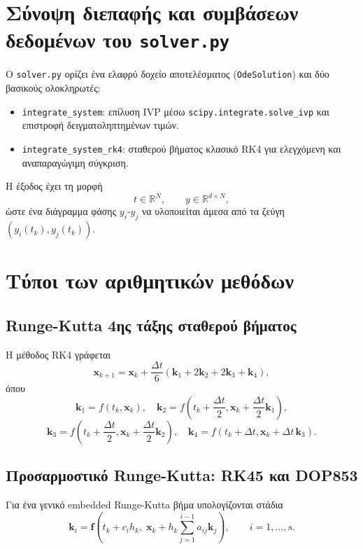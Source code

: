 \documentclass[11pt,a4paper]{report}
\begin{document}
\section{Σύνοψη διεπαφής και συμβάσεων δεδομένων του \texttt{solver.py}}
\label{app:solver-interface}
\begin{importantbox}
Ο \texttt{solver.py} ορίζει ένα ελαφρύ δοχείο αποτελέσματος
(\texttt{OdeSolution}) και δύο βασικούς ολοκληρωτές:
\begin{itemize}
\item \texttt{integrate\_system}: επίλυση IVP μέσω
\texttt{scipy.integrate.solve\_ivp} και επιστροφή δειγματοληπτημένων τιμών.
\item \texttt{integrate\_system\_rk4}: σταθερού βήματος κλασικό RK4 για
ελεγχόμενη και αναπαραγώγιμη σύγκριση.
\end{itemize}
Η έξοδος έχει τη μορφή
\begin{equation*}
t \in \mathbb{R}^{N}, \qquad y \in \mathbb{R}^{d \times N},
\end{equation*}
ώστε ένα διάγραμμα φάσης $y_i$-$y_j$ να υλοποιείται άμεσα από τα ζεύγη
$(y_i(t_k),y_j(t_k))$.
\end{importantbox}

\section{Τύποι των αριθμητικών μεθόδων}

\subsection{Runge-Kutta 4ης τάξης σταθερού βήματος}
\label{app:rk4-formula}
Η μέθοδος RK4 γράφεται
\begin{equation}
\mathbf{x}_{k+1}=\mathbf{x}_k+\frac{\Delta t}{6}\left(\mathbf{k}_1+2\mathbf{k}_2+2\mathbf{k}_3+\mathbf{k}_4\right),
\end{equation}
όπου
\begin{equation}
\mathbf{k}_1=f(t_k,\mathbf{x}_k),\quad
\mathbf{k}_2=f\!\left(t_k+\frac{\Delta t}{2},\mathbf{x}_k+\frac{\Delta t}{2}\mathbf{k}_1\right),
\end{equation}
\begin{equation}
\mathbf{k}_3=f\!\left(t_k+\frac{\Delta t}{2},\mathbf{x}_k+\frac{\Delta t}{2}\mathbf{k}_2\right),\quad
\mathbf{k}_4=f\!\left(t_k+\Delta t,\mathbf{x}_k+\Delta t\,\mathbf{k}_3\right).
\end{equation}

\subsection{Προσαρμοστικό Runge-Kutta: RK45 και DOP853}
\label{app:adaptive-rk-formulas}
Για ένα γενικό embedded Runge-Kutta βήμα υπολογίζονται στάδια
\begin{equation}
\mathbf{k}_i=\mathbf{f}\!\left(t_k+c_i h_k,\;\mathbf{x}_k+h_k\sum_{j=1}^{i-1}a_{ij}\mathbf{k}_j\right),
\qquad i=1,\dots,s.
\end{equation}
\end{document}
